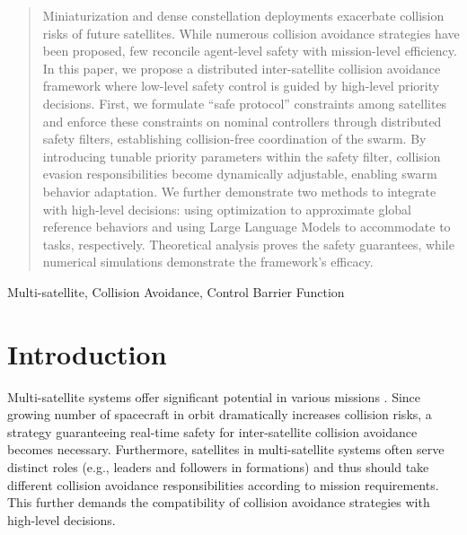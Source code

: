 \documentclass{ifacconf}
\begin{document}
\begin{frontmatter}
\begin{abstract}
   Miniaturization and dense constellation deployments exacerbate collision risks of future satellites. 
   While numerous collision avoidance strategies have been proposed, few reconcile agent-level safety with mission-level efficiency.
   In this paper, we propose a distributed inter-satellite collision avoidance framework where low-level safety control is guided by high-level priority decisions.
   First, we formulate ``safe protocol'' constraints among satellites and enforce these constraints on nominal controllers through distributed safety filters, establishing collision-free coordination of the swarm.
   By introducing tunable priority parameters within the safety filter, collision evasion responsibilities become dynamically adjustable, enabling swarm behavior adaptation. 
   We further demonstrate two methods to integrate with high-level decisions: using optimization to approximate global reference behaviors and using Large Language Models to accommodate to tasks, respectively.
   Theoretical analysis proves the safety guarantees, while numerical simulations demonstrate the framework's efficacy.
\end{abstract}

\begin{keyword}
Multi-satellite, Collision Avoidance, Control Barrier Function
\end{keyword}

\end{frontmatter}

\section{Introduction}
\par Multi-satellite systems offer significant potential in various missions \cite[]{Bandyopadhyay2015SmallSatReview}.
Since growing number of spacecraft in orbit dramatically increases collision risks, a strategy guaranteeing real-time safety for inter-satellite collision avoidance becomes necessary. 
Furthermore, satellites in multi-satellite systems often serve distinct roles (e.g., leaders and followers in formations) and thus should take different collision avoidance responsibilities according to mission requirements.
This further demands the compatibility of collision avoidance strategies with high-level decisions.
\end{document}
